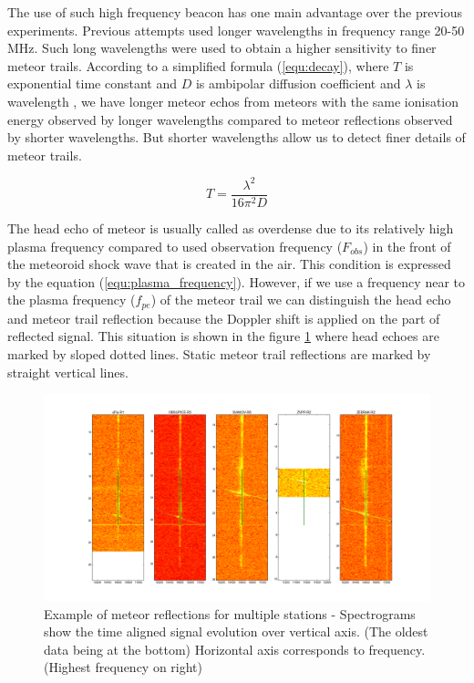 \documentclass[twoside]{ctuthesis}
\theoremstyle{plain}
\theoremstyle{definition}
\theoremstyle{note}
\begin{document}
The use of such high frequency beacon has one main advantage over the previous experiments.
Previous attempts used longer wavelengths in frequency range 20-50 MHz. Such long wavelengths were used to obtain a higher sensitivity to finer meteor trails. According to a simplified formula (\ref{equ:decay}), where $T$ is exponential time constant and $D$ is ambipolar diffusion coefficient and $\lambda$ is wavelength \cite{Decay_time}, we have longer meteor echos from meteors with the same ionisation energy observed by longer wavelengths compared to meteor reflections observed by shorter wavelengths. But shorter wavelengths allow us to detect finer details of meteor trails.

\begin{equation}
T = \frac{\lambda^2}{16 \pi ^2 D}
\label{equ:decay}
\end{equation}

The head echo of meteor is usually called as overdense due to its relatively high plasma frequency compared to used observation frequency ($F_{obs}$) in the front of the meteoroid shock wave that is created in the air. This condition is expressed by the equation (\ref{equ:plasma_frequency}). However, if we use a frequency near to the plasma frequency ($f_{pe}$) of the meteor trail we can distinguish the head echo and meteor trail reflection because the Doppler shift is applied on the part of reflected signal. This situation is shown in the figure \ref{fig:meteor_reflections} where head echoes are marked by sloped dotted lines. Static meteor trail reflections are marked by straight vertical lines.

\begin{figure}
 \begin{center}
 \includegraphics[width=\textwidth]{./img/Raws_analyser.png}
 \caption{Example of meteor reflections for multiple stations - Spectrograms show the time aligned signal evolution over vertical axis. (The oldest data being at the bottom) Horizontal axis corresponds to frequency. (Highest frequency on right)}
  \label{fig:meteor_reflections} 
 \end{center}
\end{figure}
\end{document}
